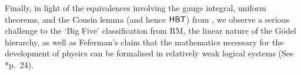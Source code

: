 \documentclass[reqno]{amsart}
\newtheorem{thm}{Theorem}
\def\RCAo{\textup{\textsf{RCA}}_{0}^{\omega}}
\def\WWKL{\textup{\textsf{WWKL}}}
\def\bye{\end{document}}
\def\R{{\mathbb  R}}
\def\MPC{\textup{\textsf{MPC}}}
\def\di{\rightarrow}
\def\asa{\leftrightarrow}
\def\ACA{\textup{\textsf{ACA}}}
\def\HBU{\textup{\textsf{HBU}}}
\def\HBT{\textup{\textsf{HBT}}}
\def\RIE{\textup{\textsf{RIE}}}
\def\eps{\varepsilon}
\numberwithin{equation}{section}
\numberwithin{thm}{section}
\begin{document}
Finally, in light of the equivalences involving the gauge integral, uniform theorems, and the Cousin lemma (and hence $\HBT$) from \cite{dagsamIII, dagsamV}, we observe a serious challenge to the `Big Five' classification from RM,  the linear nature of the G\"odel hierarchy,
 as well as Feferman's claim that the mathematics necessary for the development of physics can be formalised in relatively weak logical systems (See \cite{dagsamIII}*{p.\ 24}).
%





\begin{bibdiv}
\begin{biblist}
\end{biblist}
\end{bibdiv}

\bye
\appendix

\section{Other stuff}
\subsection{$\WWKL$ stuff}
Let $\textsf{WRIE}$ be the statement that 
\begin{thm}[$\textsf{WRIE}$]
For $g^{2}, N^{0},\eps>0$, there is $\delta>0$ such that for all $f:\R\di \R$
\[
[\MPC(g, f)\wedge (\forall x\in I)(|f(x)|\leq N)] \di \RIE(\eps, \delta, f)
\]

\end{thm}

\begin{thm}
The system $\RCAo$ proves that $\WWKL\asa (\exists^{2})\vee \textsf{WRIE}$
\end{thm}
\begin{proof}
Coding is a bitch, so it may not be true (or hard to prove).
\end{proof}

\subsection{Polya's theorem}
See Bartle's book ERA (elementary real analysis), 1964, p.\ 194.   This theorems generalises Dini's theorem and should easily yield $\HBU$ or so.  
\end{document}
